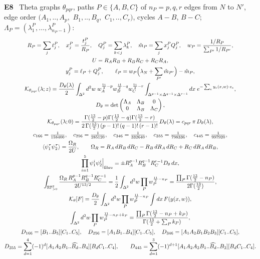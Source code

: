 \documentclass[10pt,a4paper]{article}
\numberwithin{equation}{section}
\newcommand{\cK}{\mathcal K}
\newcommand{\RPp}[1]{\mathbb{RP}^{#1}_{>0}}
\newcommand{\Ed}[1]{\textsf{11d}(#1)}
\newcommand{\rid}[1]{\par\medskip\noindent\textbf{#1}\ }
\newcommand{\ptr}[2]{\par\nopagebreak{\footnotesize\raggedleft[\,#1\ $\mid$\ #2\,]\par}}
\newcommand{\st}[1]{\textsf{#1}}
\begin{document}
\rid{E8} Theta graphs $\theta_{pqr}$, paths $P\in\{A,B,C\}$ of $n_P=p,q,r$ edges from $N$ to $N'$, edge order $(A_1,..,A_p,$ $B_1,..,B_q,$ $C_1,..,C_r)$, cycles $A-B$, $B-C$; $\Lambda_P=(\lambda^P_1,\dots,\lambda^P_{n_P-1})$:
\begin{gather*}
R_P=\sum_jt^P_j,\quad x^P_j=\frac{t^P_j}{R_P},\quad Q^P_j=\sum_{k<j}\lambda^P_k,\quad\hat m_P=\sum_jx^P_jQ^P_j,\quad w_P=\frac{1/R_P}{\sum_{P'}1/R_{P'}},\\
U=R_AR_B+R_BR_C+R_CR_A,\\
y^P_j=\ell_P+Q^P_j,\qquad\ell_P=w_P\Big(\lambda_N+\sum_{P'}\hat m_{P'}\Big)-\hat m_P,\\
\cK_{\theta_{pqr}}(\lambda;z)=\frac{D_\theta(\lambda)}2\int_{\Delta^2}d^2w\;w_A^{\frac{11}2-p}w_B^{\frac{11}2-q}w_C^{\frac{11}2-r}\int_{\Delta^{p-1}\times\Delta^{q-1}\times\Delta^{r-1}}dx\;e^{-\sum_ey_e(x,w)\cdot z_e},\\
D_\theta=\det\begin{pmatrix}\Lambda_A&\Lambda_B&0\\0&\Lambda_B&\Lambda_C\end{pmatrix},\\
\cK_{\theta_{pqr}}(\lambda;0)=\frac{\Gamma(\frac{13}2-p)\Gamma(\frac{13}2-q)\Gamma(\frac{13}2-r)}{2\,\Gamma(\frac{13}2)\,(p-1)!\,(q-1)!\,(r-1)!}\,D_\theta(\lambda)=c_{pqr}\,\pi\,D_\theta(\lambda),\\
c_{166}=\tfrac1{158400},\quad c_{256}=\tfrac1{285120},\quad c_{346}=\tfrac1{332640},\quad c_{355}=\tfrac1{798336},\quad c_{445}=\tfrac1{997920},\\
\langle\psi^\tau_1\psi^\tau_2\rangle=\frac{\Omega_R}{2U},\qquad\Omega_R=R_A\,dR_B\,dR_C-R_B\,dR_A\,dR_C+R_C\,dR_A\,dR_B,\\
\prod_{i=1}^5\psi^i_1\psi^i_2\Big|_{\rm fibre}=\pm R_A^{p-1}R_B^{q-1}R_C^{r-1}D_\theta\,dx,\\
\int_{\RPp2}\frac{\Omega_R\,R_A^{p-1}R_B^{q-1}R_C^{r-1}}{2U^{13/2}}=\frac12\int_{\Delta^2}d^2w\prod_Pw_P^{\frac{11}2-n_P}=\frac{\prod_P\Gamma(\frac{13}2-n_P)}{2\Gamma(\frac{13}2)},\\
\cK_\theta[F]=\frac{D_\theta}2\int_{\Delta^2}d^2w\prod_Pw_P^{\frac{11}2-n_P}\int dx\,F(y(x,w)),\\
\int_{\Delta^2}d^2w\prod_Pw_P^{\frac{11}2-n_P+k_P}=\frac{\prod_P\Gamma(\frac{13}2-n_P+k_P)}{\Gamma(\frac{13}2+\sum_Pk_P)},\\
D_{166}=[B_1..B_5][C_1..C_5],\quad D_{256}=[A_1B_1..B_4][C_1..C_5],\quad D_{346}=[A_1A_2B_1B_2B_3][C_1..C_5],\\
D_{355}=\sum_{d=1}^4(-1)^d[A_1A_2B_1..\widehat{B_d}..B_4][B_dC_1..C_4],\qquad D_{445}=\sum_{d=1}^3(-1)^{d+1}[A_1A_2A_3B_1..\widehat{B_d}..B_3][B_dC_1..C_4].
\end{gather*}
\ptr{\Ed{7.1}, \Ed{7.2}; Thm 7.1 \Ed{7.3}$=$\Ed{0.9}, \Ed{7.4}, \Ed{7.5}, \Ed{0.10}; \Ed{7.6}--\Ed{7.12}}{\st{P}; \st{C} (\st{N}), \st{R}: \path{forms_check.py}, \path{pointwise.py} (integrand $=-\tfrac12D_\theta\prod_Pw_P^{11/2-n_P}|dx\,d^2w|$ w.r.t.\ $\iota_{\mathcal E}\prod dt_e$; with $\varsigma_\theta=-1$), \path{consts.py}, \path{extra_checks.py}; $c_{pqr}$ \st{E}}
\end{document}
